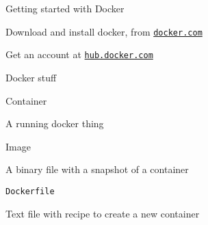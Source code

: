 \documentclass[aspectratio=169,12pt,t]{beamer}
\begin{document}
\begin{frame}{Getting started with Docker}

  \bbi
\item Download and install docker, from
  \href{https://www.docker.com/products/docker-desktop}{\tt docker.com}
\item Get an account at \href{https://hub.docker.com}{\tt hub.docker.com}
  \ei

\end{frame}





\begin{frame}{Docker stuff}

  \bbi
\item Container
  \bi
\item[] A running docker thing
  \ei
  \item Image
    \bi
  \item[] A binary file with a snapshot of a container
    \ei
  \item {\tt Dockerfile}
    \bi
  \item[] Text file with recipe to create a new container
    \ei
  \ei

\end{frame}
\end{document}
